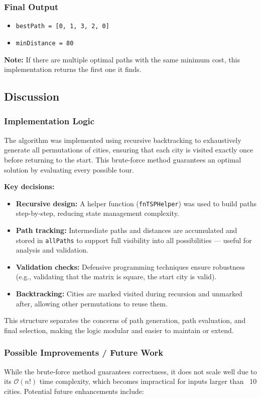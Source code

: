 \documentclass{article}
\begin{document}
\subsubsection*{Final Output}
\begin{itemize}
    \item \texttt{bestPath = [0, 1, 3, 2, 0]}
    \item \texttt{minDistance = 80}
\end{itemize}
\textbf{Note:} If there are multiple optimal paths with the same minimum cost, this implementation returns the first one it finds.


\subsection*{Discussion}
\subsubsection*{Implementation Logic}
The algorithm was implemented using recursive backtracking to exhaustively generate all permutations of cities, ensuring that each city is visited exactly once before returning to the start. This brute-force method guarantees an optimal solution by evaluating every possible tour.

\textbf{Key decisions:}
\begin{itemize}
    \item \textbf{Recursive design:} A helper function (\texttt{fnTSPHelper}) was used to build paths step-by-step, reducing state management complexity.
    \item \textbf{Path tracking:} Intermediate paths and distances are accumulated and stored in \texttt{allPaths} to support full visibility into all possibilities — useful for analysis and validation.
    \item \textbf{Validation checks:} Defensive programming techniques ensure robustness (e.g., validating that the matrix is square, the start city is valid).
    \item \textbf{Backtracking:} Cities are marked visited during recursion and unmarked after, allowing other permutations to reuse them.
\end{itemize}

This structure separates the concerns of path generation, path evaluation, and final selection, making the logic modular and easier to maintain or extend.

\subsubsection*{Possible Improvements / Future Work}
While the brute-force method guarantees correctness, it does not scale well due to its \(\mathcal{O}(n!)\) time complexity, which becomes impractical for inputs larger than ~10 cities. Potential future enhancements include:
\end{document}

